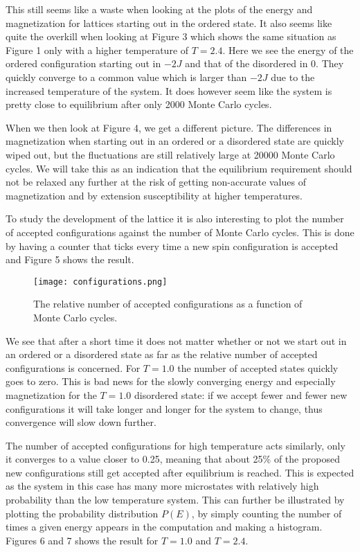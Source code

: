 \documentclass[english, 12pt]{article}
\begin{document}
This still seems like a waste when looking at the plots of the energy and magnetization for lattices starting out in the ordered state. It also seems like quite the overkill when looking at Figure 3 which shows the same situation as Figure 1 only with a higher temperature of $T=2.4$. Here we see the energy of the ordered configuration starting out in $-2J$ and that of the disordered in 0. They quickly converge to a common value which is larger than $-2J$ due to the increased temperature of the system. It does however seem like the system is pretty close to equilibrium after only 2000 Monte Carlo cycles.

When we then look at Figure 4, we get a different picture. The differences in magnetization when starting out in an ordered or a disordered state are quickly wiped out, but the fluctuations are still relatively large at 20000 Monte Carlo cycles. We will take this as an indication that the equilibrium requirement should not be relaxed any further at the risk of getting non-accurate values of magnetization and by extension susceptibility at higher temperatures.


To study the development of the lattice it is also interesting to plot the number of accepted configurations against the number of Monte Carlo cycles. This is done by having a counter that ticks every time a new spin configuration is accepted and Figure 5 shows the result.

\begin{figure}[hbt!]
\centering
\texttt{[image: configurations.png]}
\caption{The relative number of accepted configurations as a function of Monte Carlo cycles.}
\end{figure}

We see that after a short time it does not matter whether or not we start out in an ordered or a disordered state as far as the relative number of accepted configurations is concerned. For $T=1.0$ the number of accepted states quickly goes to zero. This is bad news for the slowly converging energy and especially magnetization for the $T=1.0$ disordered state: if we accept fewer and fewer new configurations it will take longer and longer for the system to change, thus convergence will slow down further.

The number of accepted configurations for high temperature acts similarly, only it converges to a value closer to 0.25, meaning that about 25\% of the proposed new configurations still get accepted after equilibrium is reached. This is expected as the system in this case has many more microstates with relatively high probability than the low temperature system. This can further be illustrated by plotting the probability distribution $P(E)$, by simply counting the number of times a given energy appears in the computation and making a histogram.
Figures 6 and 7 shows the result for $T=1.0$ and $T=2.4$.
\end{document}
